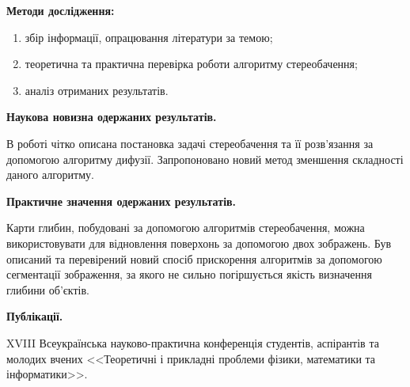\textbf{Методи дослідження:}
\begin{enumerate}
    \item збір інформації, опрацювання літератури за темою;
    \item теоретична та практична перевірка роботи алгоритму стереобачення;
    \item аналіз отриманих результатів.
\end{enumerate}

\textbf{Наукова новизна одержаних результатів.}

В роботі чітко описана постановка задачі стереобачення
та її розв'язання за допомогою алгоритму дифузії.
Запропоновано новий метод зменшення складності даного алгоритму.

\textbf{Практичне значення одержаних результатів.}

Карти глибин, побудовані за допомогою алгоритмів стереобачення,
можна використовувати для відновлення поверхонь за допомогою двох зображень.
Був описаний та перевірений
новий спосіб прискорення алгоритмів за допомогою сегментації зображення,
за якого не сильно погіршується якість визначення глибини об'єктів.

\textbf{Публікації.}

XVIII Всеукраїнська науково-практична конференція студентів,
аспірантів та молодих вчених <<Теоретичні і прикладні проблеми фізики,
математики та інформатики>>.
